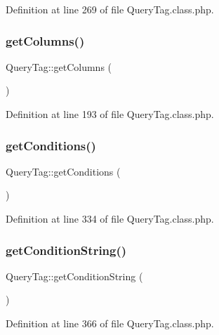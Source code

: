 Definition at line 269 of file Query\+Tag.\+class.\+php.

\hypertarget{classQueryTag_a4909be88c35581f69baa42ec67c6a58d}{}\label{classQueryTag_a4909be88c35581f69baa42ec67c6a58d} 
\subsubsection{\texorpdfstring{get\+Columns()}{getColumns()}}
{\footnotesize\ttfamily Query\+Tag\+::get\+Columns (\begin{DoxyParamCaption}{ }\end{DoxyParamCaption})}



Definition at line 193 of file Query\+Tag.\+class.\+php.

\hypertarget{classQueryTag_a0ee36c6d269e79842fb5e234405b9e3b}{}\label{classQueryTag_a0ee36c6d269e79842fb5e234405b9e3b} 
\subsubsection{\texorpdfstring{get\+Conditions()}{getConditions()}}
{\footnotesize\ttfamily Query\+Tag\+::get\+Conditions (\begin{DoxyParamCaption}{ }\end{DoxyParamCaption})}



Definition at line 334 of file Query\+Tag.\+class.\+php.

\hypertarget{classQueryTag_a867e1058c082898d0d6e97a04b8901f8}{}\label{classQueryTag_a867e1058c082898d0d6e97a04b8901f8} 
\subsubsection{\texorpdfstring{get\+Condition\+String()}{getConditionString()}}
{\footnotesize\ttfamily Query\+Tag\+::get\+Condition\+String (\begin{DoxyParamCaption}{ }\end{DoxyParamCaption})}



Definition at line 366 of file Query\+Tag.\+class.\+php.

